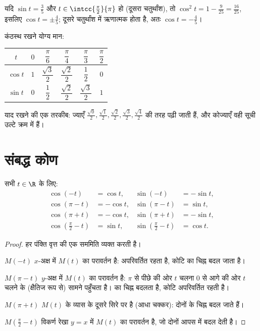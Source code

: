 \begin{example}\label{ex:g11:trigo:identity}
यदि $\sin t = \frac35$ और $t \in \intcc{\frac\pi2}{\pi}$ हो (दूसरा चतुर्थांश), तो $\cos^2 t = 1 - \frac{9}{25} = \frac{16}{25}$, इसलिए $\cos t = \pm\frac45$; दूसरे चतुर्थांश
में  ऋणात्मक होता है, अतः $\cos t = -\frac45$।
\end{example}

कंठस्थ रखने योग्य मान:
\begin{center}
\begin{tabular}{c|ccccc}
$t$ & $0$ & $\dfrac{\pi}{6}$ & $\dfrac{\pi}{4}$ & $\dfrac{\pi}{3}$ & $\dfrac{\pi}{2}$\\[6pt]
\hline\rule{0pt}{14pt}%
$\cos t$ & $1$ & $\dfrac{\sqrt3}{2}$ & $\dfrac{\sqrt2}{2}$ & $\dfrac12$ & $0$\\[6pt]
$\sin t$ & $0$ & $\dfrac12$ & $\dfrac{\sqrt2}{2}$ & $\dfrac{\sqrt3}{2}$ & $1$
\end{tabular}
\end{center}

\begin{remark}
याद रखने की एक तरकीब: ज्याएँ $\frac{\sqrt0}{2}, \frac{\sqrt1}{2}, \frac{\sqrt2}{2}, \frac{\sqrt3}{2},
\frac{\sqrt4}{2}$ की तरह पढ़ी जाती हैं, और कोज्याएँ वही सूची
उल्टे क्रम में हैं।
\end{remark}

\section{संबद्ध कोण}

\begin{proposition}[संबद्ध कोण]\label{prop:g11:trigo:associated}
सभी $t \in \R$ के लिए:
\[
\begin{aligned}
\cos(-t) &= \cos t, & \sin(-t) &= -\sin t,\\
\cos(\pi - t) &= -\cos t, & \sin(\pi - t) &= \sin t,\\
\cos(\pi + t) &= -\cos t, & \sin(\pi + t) &= -\sin t,\\
\cos\left(\tfrac{\pi}{2} - t\right) &= \sin t, &
\sin\left(\tfrac{\pi}{2} - t\right) &= \cos t .
\end{aligned}
\]
\end{proposition}

\begin{proof}
हर पंक्ति वृत्त की एक सममिति व्यक्त करती है।

$M(-t)$ $x$-अक्ष में $M(t)$ का परावर्तन है:  अपरिवर्तित रहता है, कोटि का
चिह्न बदल जाता है।

$M(\pi - t)$ $y$-अक्ष में $M(t)$ का परावर्तन है: $\pi$ से पीछे की ओर $t$ चलना $0$
से आगे की ओर $t$ चलने के (क्षैतिज रूप से) सामने पहुँचता है।  का चिह्न
बदलता है, कोटि अपरिवर्तित रहती है।

$M(\pi + t)$ $M(t)$ के व्यास के दूसरे सिरे पर है (आधा चक्कर): दोनों  के
चिह्न बदल जाते हैं।

$M\!\left(\frac\pi2 - t\right)$ विकर्ण रेखा $y = x$ में $M(t)$ का परावर्तन है, जो दोनों  आपस
में बदल देती है।
\end{proof}

